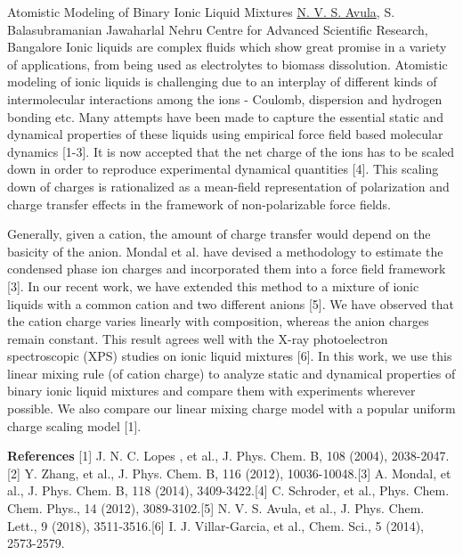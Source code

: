 
    \begin{abstract_online}{Atomistic Modeling of Binary Ionic Liquid Mixtures}{%
        \underline{N. V. S. Avula}, S. Balasubramanian}{%
        }{%
        Jawaharlal Nehru Centre for Advanced Scientific Research, Bangalore}
    Ionic liquids are complex fluids which show great promise in a variety of applications, from being used as electrolytes to biomass dissolution. Atomistic modeling of ionic liquids is challenging due to an interplay of different kinds of intermolecular interactions among the ions - Coulomb, dispersion and hydrogen bonding etc. Many attempts have been made to capture the essential static and dynamical properties of these liquids using empirical force field based molecular dynamics [1-3]. It is now accepted that the net charge of the ions has to be scaled down in order to reproduce experimental dynamical quantities [4]. This scaling down of charges is rationalized as a mean-field representation of polarization and charge transfer effects in the framework of non-polarizable force fields. \par  Generally, given a cation, the amount of charge transfer would depend on the basicity of the anion. Mondal et al. have devised a methodology to estimate the condensed phase ion charges and incorporated them into a force field framework [3]. In our recent work, we have extended this method to a mixture of ionic liquids with a common cation and two different anions [5]. We have observed that the cation charge varies linearly with composition, whereas the anion charges remain constant. This result agrees well with the X-ray photoelectron spectroscopic (XPS) studies on ionic liquid mixtures [6]. In this work, we use this linear mixing rule (of cation charge) to analyze static and dynamical properties of binary ionic liquid mixtures and compare them with experiments wherever possible. We also compare our linear mixing charge model with a popular uniform charge scaling model [1]. 
    
        \textbf{References} \newline{}[1] J. N. C. Lopes , et al., J. Phys. Chem. B, 108 (2004), 2038-2047.\newline{}[2] Y. Zhang, et al., J. Phys. Chem. B, 116 (2012), 10036-10048.\newline{}[3] A. Mondal, et al., J. Phys. Chem. B, 118 (2014), 3409-3422.\newline{}[4] C. Schroder, et al., Phys. Chem. Chem. Phys., 14 (2012), 3089-3102.\newline{}[5] N. V. S. Avula, et al., J. Phys. Chem. Lett., 9 (2018), 3511-3516.\newline{}[6] I. J. Villar-Garcia, et al., Chem. Sci., 5 (2014), 2573-2579. 
    \end{abstract_online}
    